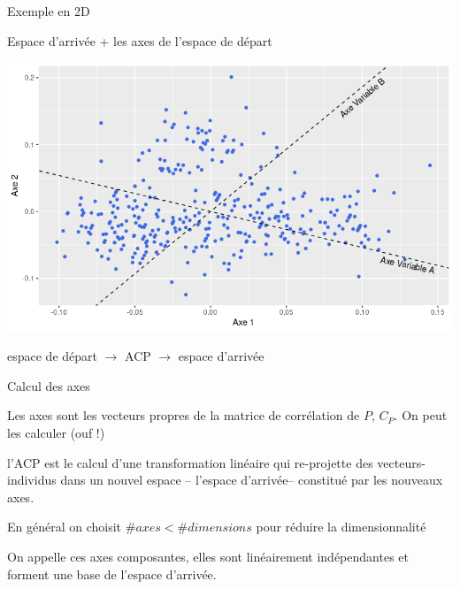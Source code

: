 \documentclass{beamer}
\begin{document}
\begin{frame}{Exemple en 2D}

Espace d'arrivée + les axes de l'espace de départ

\centering
\includegraphics[width=\textwidth,keepaspectratio]{img/exemple_2D_arrivee_axes.png}

\end{frame}




\begin{frame}


espace de départ $\rightarrow$ ACP $\rightarrow$ espace d'arrivée 

\end{frame}




\begin{frame}{Calcul des axes}

Les \alert{axes} sont les \alert{vecteurs propres} de la matrice de corrélation de $P$, $C_P$. 
On peut les calculer (ouf !)

\medskip

l'ACP est le calcul d’une transformation linéaire qui \alert{re-projette} des vecteurs-individus dans un nouvel \alert{espace} -- l'espace d'arrivée--  constitué par les \alert{nouveaux axes}.

\medskip

En général on choisit $\#axes < \#dimensions$ pour \alert{réduire la dimensionnalité} 


On appelle ces axes \alert{composantes}, elles sont \alert{linéairement indépendantes} et forment une \alert{base} de l'espace d'arrivée.
\end{frame}
\end{document}
